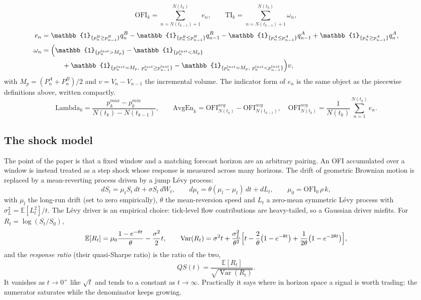 \documentclass[11pt]{article}
\newcommand{\E}{\mathbb{E}}
\newcommand{\ind}[1]{\mathbb{1}_{\{#1\}}}
\DeclareMathOperator{\Var}{Var}
\begin{document}
\begin{equation}
\mathrm{OFI}_k=\sum_{n=N(t_{k-1})+1}^{N(t_k)} e_n,
\qquad
\mathrm{TI}_k=\sum_{n=N(t_{k-1})+1}^{N(t_k)} \omega_n,
\end{equation}
\begin{align}
e_n&=\ind{p^B_n\ge p^B_{n-1}}q^B_n-\ind{p^B_n\le p^B_{n-1}}q^B_{n-1}
-\ind{p^A_n\le p^A_{n-1}}q^A_{n-1}+\ind{p^A_n\ge p^A_{n-1}}q^A_n,\\
\omega_n&=\Bigl(\ind{p^{last}_n>M_p}-\ind{p^{last}_n<M_p}\notag\\
&\qquad\quad+\ind{p^{last}_n=M_p,\ p^{last}_n\ge p^{last}_{n-1}}
-\ind{p^{last}_n=M_p,\ p^{last}_n<p^{last}_{n-1}}\Bigr)v,
\end{align}
with $M_p=(P^A_n+P^B_n)/2$ and $v=V_n-V_{n-1}$ the incremental volume. The
indicator form of $e_n$ is the same object as the piecewise definitions above,
written compactly.
\begin{equation}
\mathrm{Lambda}_k=\frac{p^{max}_k-p^{min}_k}{N(t_k)-N(t_{k-1})},
\qquad
\mathrm{AvgEn}_k=\mathrm{OFI}^{avg}_{N(t_k)}-\mathrm{OFI}^{avg}_{N(t_{k-1})},
\quad
\mathrm{OFI}^{avg}_{N(t_k)}=\frac{1}{N(t_k)}\sum_{n=1}^{N(t_k)}e_n.
\end{equation}

\subsection{The shock model}

The point of the paper is that a fixed window and a matching forecast horizon
are an arbitrary pairing. An OFI accumulated over a window is instead treated as
a step shock whose response is measured across many horizons. The drift of
geometric Brownian motion is replaced by a mean-reverting process driven by a
jump L\'evy process:
\begin{equation}
dS_t=\mu_t S_t\,dt+\sigma S_t\,dW_t,
\qquad
d\mu_t=\theta(\mu_l-\mu_t)\,dt+dL_t,
\qquad \mu_0=\mathrm{OFI}_0\,\rho\,k,
\end{equation}
with $\mu_l$ the long-run drift (set to zero empirically), $\theta$ the
mean-reversion speed and $L_t$ a zero-mean symmetric L\'evy process with
$\sigma_L^2=\E[L_t^2]/t$. The L\'evy driver is an empirical choice: tick-level
flow contributions are heavy-tailed, so a Gaussian driver misfits. For
$R_t=\log(S_t/S_0)$,
\begin{equation}
\E[R_t]=\mu_0\frac{1-e^{-\theta t}}{\theta}-\frac{\sigma^2}{2}t,
\qquad
\Var(R_t)=\sigma^2 t+\frac{\sigma_L^2}{\theta^2}
\Bigl[t-\frac{2}{\theta}\bigl(1-e^{-\theta t}\bigr)+\frac{1}{2\theta}\bigl(1-e^{-2\theta t}\bigr)\Bigr],
\end{equation}
and the \emph{response ratio} (their quasi-Sharpe ratio) is the ratio of the two,
\begin{equation}
QS(t)=\frac{\E[R_t]}{\sqrt{\Var(R_t)}} .
\end{equation}
It vanishes as $t\to0^+$ like $\sqrt{t}$ and tends to a constant as
$t\to\infty$. Practically it says where in horizon space a signal is worth
trading: the numerator saturates while the denominator keeps growing.
\end{document}
